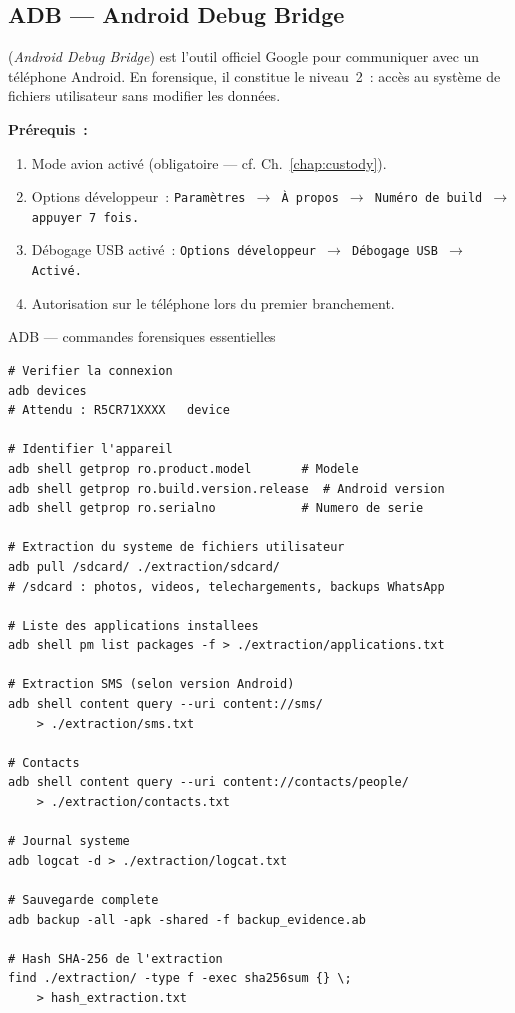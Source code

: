\subsection{ADB --- Android Debug Bridge}

 (\textit{Android Debug Bridge}) est l'outil
officiel Google pour communiquer avec un téléphone Android. En forensique,
il constitue le niveau~2~: accès au système de fichiers utilisateur sans
modifier les données.

\textbf{Prérequis~:}
\begin{enumerate}
    \item Mode avion activé (obligatoire --- cf. Ch.~\ref{chap:custody}).
    \item Options développeur~: \texttt{Paramètres~$\to$ À propos~$\to$
          Numéro de build~$\to$ appuyer 7~fois.}
    \item Débogage USB activé~: \texttt{Options développeur~$\to$
          Débogage USB~$\to$ Activé.}
    \item Autorisation sur le téléphone lors du premier branchement.
\end{enumerate}

\begin{boxoutils}{ADB --- commandes forensiques essentielles}
\begin{lstlisting}[language=bash_forensique]
# Verifier la connexion
adb devices
# Attendu : R5CR71XXXX   device

# Identifier l'appareil
adb shell getprop ro.product.model       # Modele
adb shell getprop ro.build.version.release  # Android version
adb shell getprop ro.serialno            # Numero de serie

# Extraction du systeme de fichiers utilisateur
adb pull /sdcard/ ./extraction/sdcard/
# /sdcard : photos, videos, telechargements, backups WhatsApp

# Liste des applications installees
adb shell pm list packages -f > ./extraction/applications.txt

# Extraction SMS (selon version Android)
adb shell content query --uri content://sms/
    > ./extraction/sms.txt

# Contacts
adb shell content query --uri content://contacts/people/
    > ./extraction/contacts.txt

# Journal systeme
adb logcat -d > ./extraction/logcat.txt

# Sauvegarde complete
adb backup -all -apk -shared -f backup_evidence.ab

# Hash SHA-256 de l'extraction
find ./extraction/ -type f -exec sha256sum {} \;
    > hash_extraction.txt
\end{lstlisting}
\end{boxoutils}

